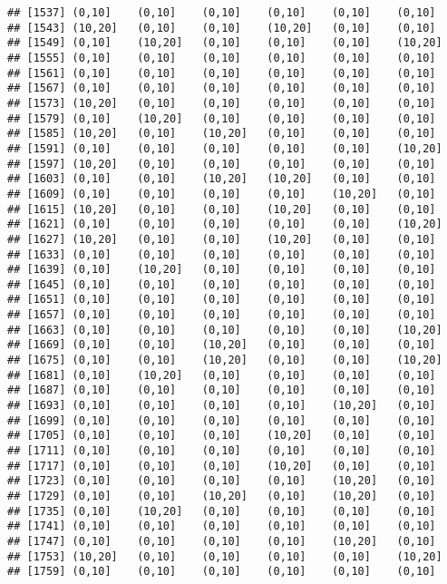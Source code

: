 \documentclass[]{article}
\begin{document}
\begin{verbatim}
## [1537] (0,10]    (0,10]    (0,10]    (0,10]    (0,10]    (0,10]   
## [1543] (10,20]   (0,10]    (0,10]    (10,20]   (0,10]    (0,10]   
## [1549] (0,10]    (10,20]   (0,10]    (0,10]    (0,10]    (10,20]  
## [1555] (0,10]    (0,10]    (0,10]    (0,10]    (0,10]    (0,10]   
## [1561] (0,10]    (0,10]    (0,10]    (0,10]    (0,10]    (0,10]   
## [1567] (0,10]    (0,10]    (0,10]    (0,10]    (0,10]    (0,10]   
## [1573] (10,20]   (0,10]    (0,10]    (0,10]    (0,10]    (0,10]   
## [1579] (0,10]    (10,20]   (0,10]    (0,10]    (0,10]    (0,10]   
## [1585] (10,20]   (0,10]    (10,20]   (0,10]    (0,10]    (0,10]   
## [1591] (0,10]    (0,10]    (0,10]    (0,10]    (0,10]    (10,20]  
## [1597] (10,20]   (0,10]    (0,10]    (0,10]    (0,10]    (0,10]   
## [1603] (0,10]    (0,10]    (10,20]   (10,20]   (0,10]    (0,10]   
## [1609] (0,10]    (0,10]    (0,10]    (0,10]    (10,20]   (0,10]   
## [1615] (10,20]   (0,10]    (0,10]    (10,20]   (0,10]    (0,10]   
## [1621] (0,10]    (0,10]    (0,10]    (0,10]    (0,10]    (10,20]  
## [1627] (10,20]   (0,10]    (0,10]    (10,20]   (0,10]    (0,10]   
## [1633] (0,10]    (0,10]    (0,10]    (0,10]    (0,10]    (0,10]   
## [1639] (0,10]    (10,20]   (0,10]    (0,10]    (0,10]    (0,10]   
## [1645] (0,10]    (0,10]    (0,10]    (0,10]    (0,10]    (0,10]   
## [1651] (0,10]    (0,10]    (0,10]    (0,10]    (0,10]    (0,10]   
## [1657] (0,10]    (0,10]    (0,10]    (0,10]    (0,10]    (0,10]   
## [1663] (0,10]    (0,10]    (0,10]    (0,10]    (0,10]    (10,20]  
## [1669] (0,10]    (0,10]    (10,20]   (0,10]    (0,10]    (0,10]   
## [1675] (0,10]    (0,10]    (10,20]   (0,10]    (0,10]    (10,20]  
## [1681] (0,10]    (10,20]   (0,10]    (0,10]    (0,10]    (0,10]   
## [1687] (0,10]    (0,10]    (0,10]    (0,10]    (0,10]    (0,10]   
## [1693] (0,10]    (0,10]    (0,10]    (0,10]    (10,20]   (0,10]   
## [1699] (0,10]    (0,10]    (0,10]    (0,10]    (0,10]    (0,10]   
## [1705] (0,10]    (0,10]    (0,10]    (10,20]   (0,10]    (0,10]   
## [1711] (0,10]    (0,10]    (0,10]    (0,10]    (0,10]    (0,10]   
## [1717] (0,10]    (0,10]    (0,10]    (10,20]   (0,10]    (0,10]   
## [1723] (0,10]    (0,10]    (0,10]    (0,10]    (10,20]   (0,10]   
## [1729] (0,10]    (0,10]    (10,20]   (0,10]    (10,20]   (0,10]   
## [1735] (0,10]    (10,20]   (0,10]    (0,10]    (0,10]    (0,10]   
## [1741] (0,10]    (0,10]    (0,10]    (0,10]    (0,10]    (0,10]   
## [1747] (0,10]    (0,10]    (0,10]    (0,10]    (10,20]   (0,10]   
## [1753] (10,20]   (0,10]    (0,10]    (0,10]    (0,10]    (10,20]  
## [1759] (0,10]    (0,10]    (0,10]    (0,10]    (0,10]    (0,10]   

\end{verbatim}
\end{document}
